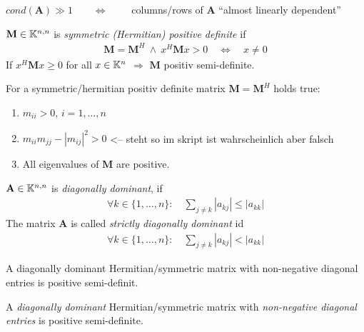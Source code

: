 		\begin{center}
			$cond(\mathbf A)  \gg 1 \qquad \Longleftrightarrow \qquad$ columns/rows of $\mathbf A$ ``almost linearly dependent''
		\end{center}

		\begin{definition}
		 $\mathbf M \in \mathbb{K}^{n,n}$ is \emph{symmetric (Hermitian) positive definite }if
		 \begin{align*}
		  \mathbf M = \mathbf M^H \ \land \ x^H \mathbf M x > 0 \quad \Longleftrightarrow \quad x \neq 0
		 \end{align*}
		 If $x^H \mathbf M x \geq 0$ for all $x \in \mathbb{K}^n$  $\Longrightarrow$ $\mathbf M$ positiv semi-definite.
		\end{definition}
		
		\begin{lemma}
		 For a symmetric/hermitian positiv definite matrix $\mathbf M = \mathbf{M}^H$ holds true:
		 \begin{enumerate}
		  \item $m_{ii} > 0$, $i=1,\ldots,n$
		  \item $m_{ii}m_{jj} - |m_{ij}|^2 > 0$ <-- steht so im skript ist wahrscheinlich aber falsch
		  \item All eigenvalues of $\mathbf M$ are positive.
		 \end{enumerate}
		\end{lemma}
		
		\begin{definition}
		 $\mathbf A \in \mathbb{K}^{n,n}$ is \emph{diagonally dominant}, if
		 \begin{align*}
		  \forall k \in \{1, \ldots, n\}: \quad \sum_{j\neq k} |a_{kj}| \leq |a_{kk}|
		 \end{align*}
		 The matrix $\mathbf A$ is called \emph{strictly diagonally dominant} id
		 \begin{align*}
		  \forall k \in \{1, \ldots, n \}: \quad \sum_{j\neq k} |a_{kj}| < |a_{kk}|
		 \end{align*}
		\end{definition}
		
		\begin{lemma}[Lemma] 
			A diagonally dominant Hermitian/symmetric matrix with non-negative diagonal entries is positive semi-definit.
		\end{lemma}

		\begin{definition}
			A \emph{diagonally dominant} Hermitian/symmetric matrix with \emph{non-negative diagonal entries} is positive semi-definite.
		\end{definition}

